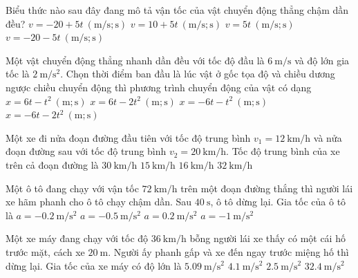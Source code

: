 \begin{ex}
	Biểu thức nào sau đây đang mô tả vận tốc của vật chuyển động thẳng chậm dần đều?
	\choice
	{\True $v=-20+5t\ \left(\si{\meter/\second}; \si{\second}\right)$}
	{$v=10+5t\ \left(\si{\meter/\second}; \si{\second}\right)$}
	{$v=5t\ \left(\si{\meter/\second}; \si{\second}\right)$}
	{$v=-20-5t\ \left(\si{\meter/\second}; \si{\second}\right)$}
	\loigiai{}
\end{ex}
\begin{ex}
	Một vật chuyển động thẳng nhanh dần đều với tốc độ đầu là $\SI{6}{\meter/\second}$ và độ lớn gia tốc là $\SI{2}{\meter/\second^2}$. Chọn thời điểm ban đầu là lúc vật ở gốc tọa độ và chiều dương ngược chiều chuyển động thì phương trình chuyển động của vật có dạng
	\choice
	{$x=6t-t^2\ \left(\si{\meter}; \si{\second}\right)$}
	{$x=6t-2t^2\ \left(\si{\meter}; \si{\second}\right)$}
	{\True $x=-6t-t^2\ \left(\si{\meter}; \si{\second}\right)$}
	{$x=-6t-2t^2\ \left(\si{\meter}; \si{\second}\right)$}
	\loigiai{}
\end{ex}
\begin{ex}
	Một xe đi nửa đoạn đường đầu tiên với tốc độ trung bình
	 $v_1=\SI{12}{\kilo\meter/\hour}$ và nửa đoạn đường	sau với tốc độ trung bình $v_2=\SI{20}{\kilo\meter/\hour}$. Tốc độ trung bình của xe trên cả đoạn đường là
	\choice
	{$\SI{30}{\kilo\meter/\hour}$}
	{\True $\SI{15}{\kilo\meter/\hour}$}
	{$\SI{16}{\kilo\meter/\hour}$}
	{$\SI{32}{\kilo\meter/\hour}$}
\end{ex}
\begin{ex}
	Một ô tô đang chạy với vận tốc $\SI{72}{\kilo\meter/\hour}$ trên một đoạn đường thắng thì người lái xe hãm phanh cho ô tô chạy chậm dần. Sau $\SI{40}{\second}$, ô tô dừng lại. Gia tốc của ô tô là
	\choice
	{$a=\SI{-0.2}{\meter/\second^2}$}
	{\True $a=\SI{-0.5}{\meter/\second^2}$}
	{$a=\SI{0.2}{\meter/\second^2}$}
	{$a=\SI{-1}{\meter/\second^2}$}
\end{ex}

\begin{ex}
	Một xe máy đang chạy với tốc độ $\SI{36}{\kilo\meter/\hour}$ bỗng người lái xe thấy có một cái hố trước mặt, cách xe $\SI{20}{\meter}$. Người ấy phanh gấp và xe đến ngay trước miệng hố thì dừng lại. Gia tốc của xe máy có độ lớn là 
	\choice
	{$\SI{5.09}{\meter/\second^2}$}
	{$\SI{4.1}{\meter/\second^2}$}
	{\True $\SI{2.5}{\meter/\second^2}$}
	{$\SI{32.4}{\meter/\second^2}$}
	\loigiai{}
\end{ex}

